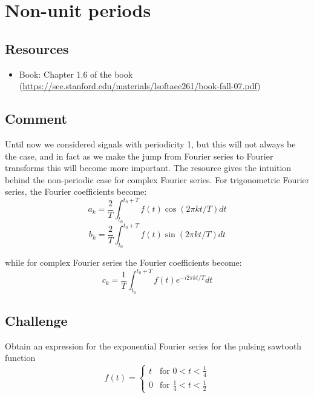 \section{Non-unit periods}

\subsection*{Resources}
\begin{itemize}
    \item Book: Chapter 1.6 of the book (\url{https://see.stanford.edu/materials/lsoftaee261/book-fall-07.pdf})
\end{itemize}

\subsection*{Comment}
Until now we considered signals with periodicity 1, but this will not always be the case, and in fact as we make the jump from Fourier series to Fourier transforms this will become more important. The resource gives the intuition behind the non-periodic case for complex Fourier series. For trigonometric Fourier series, the Fourier coefficients become:
\begin{equation}
    a_k = \frac{2}{T} \int_{t_0}^{t_0+T} f(t) \cos(2 \pi k t/T) dt
\end{equation}
\begin{equation}
    b_k = \frac{2}{T} \int_{t_0}^{t_0+T} f(t) \sin(2 \pi k t/T) dt
\end{equation}

while for complex Fourier series the Fourier coefficients become:
\begin{equation}
    c_k = \frac{1}{T} \int_{t_0}^{t_0+T} f(t) e^{-i 2 \pi kt/T} dt
\end{equation}

\subsection*{Challenge}
Obtain an expression for the exponential Fourier series for the pulsing sawtooth function
\begin{equation}
    f(t)=
    \begin{cases}
        t & \text{for } 0<t<\frac{1}{4} \\
        0 & \text{for } \frac{1}{4}<t<\frac{1}{2}
    \end{cases}
\end{equation}

